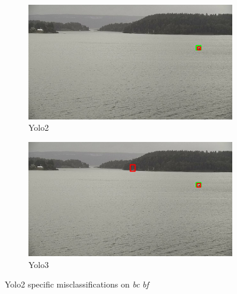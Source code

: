 \begin{figure}[h!]
\begin{subfigure}{.5\textwidth}
  \centering
  \includegraphics[width=0.9\linewidth]{results/case_buildings/yolo23/2better/yolo2/selected_08_09_frame5360.jpg}
  \caption{Yolo2}
\end{subfigure}%
\begin{subfigure}{.5\textwidth}
  \centering
  \includegraphics[width=.9\linewidth]{results/case_buildings/yolo23/2better/yolo3/selected_08_09_frame5360.jpg}
  \caption{Yolo3}
\end{subfigure}
\caption{Yolo2 specific misclassifications on \textit{bc} \textit{bf}}
\label{img:yolo2_misclas}


\end{figure}

